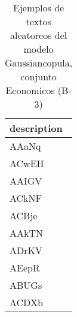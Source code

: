 \begin{table}[H]
\centering
\fontsize{8}{14}\selectfont
\caption{Ejemplos de textos aleatoreos del modelo Gaussiancopula, conjunto Economicos (B-3)}
\label{table-sample10-economicos-b-3-gaussiancopula-text}
\begin{tabular}{|m{50em}|}
\hline
\rowcolor[gray]{0.8}
description \\
\hline AAaNq \\
\hline ACwEH \\
\hline AAIGV \\
\hline ACkNF \\
\hline ACBje \\
\hline AAkTN \\
\hline ADrKV \\
\hline AEepR \\
\hline ABUGs \\
\hline ACDXb \\
\hline
\end{tabular}
\end{table}
